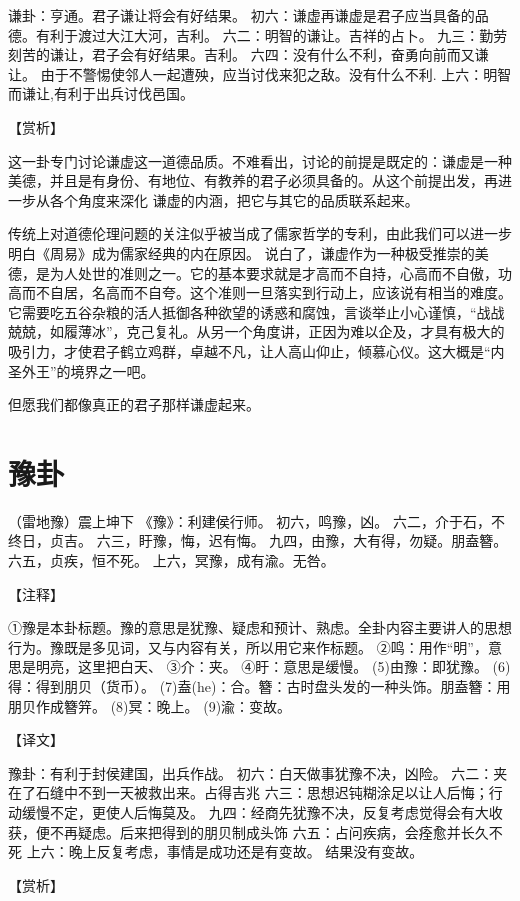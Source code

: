 \documentclass[a4paper,12pt,UTF8,twoside]{ctexbook}
\begin{document}
谦卦：亨通。君子谦让将会有好结果。
初六：谦虚再谦虚是君子应当具备的品德。有利于渡过大江大河，吉利。
六二：明智的谦让。吉祥的占卜。
九三：勤劳刻苦的谦让，君子会有好结果。吉利。
六四：没有什么不利，奋勇向前而又谦让。 由于不警惕使邻人一起遭殃，应当讨伐来犯之敌。没有什么不利.
上六：明智而谦让,有利于出兵讨伐邑国。

【赏析】

这一卦专门讨论谦虚这一道德品质。不难看出，讨论的前提是既定的：谦虚是一种美德，并且是有身份、有地位、有教养的君子必须具备的。从这个前提出发，再进一步从各个角度来深化 谦虚的内涵，把它与其它的品质联系起来。

传统上对道德伦理问题的关注似乎被当成了儒家哲学的专利，由此我们可以进一步明白《周易》成为儒家经典的内在原因。 说白了，谦虚作为一种极受推崇的美德，是为人处世的准则之一。它的基本要求就是才高而不自持，心高而不自傲，功高而不自居，名高而不自夸。这个准则一旦落实到行动上，应该说有相当的难度。它需要吃五谷杂粮的活人抵御各种欲望的诱惑和腐蚀，言谈举止小心谨慎，“战战兢兢，如履薄冰”，克己复礼。从另一个角度讲，正因为难以企及，才具有极大的吸引力，才使君子鹤立鸡群，卓越不凡，让人高山仰止，倾慕心仪。这大概是“内圣外王”的境界之一吧。

但愿我们都像真正的君子那样谦虚起来。


\chapter{豫卦}

（雷地豫）震上坤下
《豫》：利建侯行师。
初六，鸣豫，凶。
六二，介于石，不终日，贞吉。
六三，盱豫，悔，迟有悔。
九四，由豫，大有得，勿疑。朋盍簪。
六五，贞疾，恒不死。
上六，冥豫，成有渝。无咎。

【注释】

①豫是本卦标题。豫的意思是犹豫、疑虑和预计、熟虑。全卦内容主要讲人的思想行为。豫既是多见词，又与内容有关，所以用它来作标题。
②鸣：用作“明”，意思是明亮，这里把白天、
③介：夹。
④盱：意思是缓慢。
(5)由豫：即犹豫。
(6)得：得到朋贝（货币）。
(7)盍(he)：合。簪：古时盘头发的一种头饰。朋盍簪：用朋贝作成簪笄。
(8)冥：晚上。
(9)渝：变故。

【译文】

豫卦：有利于封侯建国，出兵作战。
初六：白天做事犹豫不决，凶险。
六二：夹在了石缝中不到一天被救出来。占得吉兆
六三：思想迟钝糊涂足以让人后悔；行动缓慢不定，更使人后悔莫及。
九四：经商先犹豫不决，反复考虑觉得会有大收获，便不再疑虑。后来把得到的朋贝制成头饰
六五：占问疾病，会痊愈并长久不死
上六：晚上反复考虑，事情是成功还是有变故。 结果没有变故。

【赏析】
\end{document}

